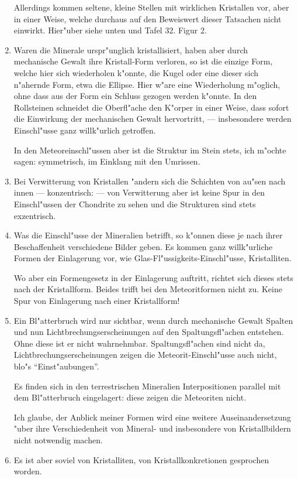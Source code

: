 \documentclass[a4paper, 11pt, oneside]{article}
\begin{document}
\begin{enumerate}
Allerdings kommen seltene, kleine Stellen mit wirklichen Kristallen vor, aber in einer Weise, welche durchaus auf den Beweiswert dieser Tatsachen nicht einwirkt. Hier"uber siehe unten und Tafel 32. Figur 2.
\item Waren die Minerale urspr"unglich kristallisiert, haben aber durch mechanische Gewalt ihre Kristall-Form verloren, so ist die einzige Form, welche hier sich wiederholen k"onnte, die Kugel oder eine dieser sich n"ahernde Form, etwa die Ellipse. Hier w"are eine Wiederholung m"oglich, ohne dass aus der Form ein Schluss gezogen werden k"onnte. In den Rollsteinen schneidet die Oberfl"ache den K"orper in einer Weise, dass sofort die Einwirkung der mechanischen Gewalt hervortritt, --- insbesondere werden Einschl"usse ganz willk"urlich getroffen.

In den Meteoreinschl"ussen aber ist die Struktur im Stein stets, ich m"ochte sagen: symmetrisch, im Einklang mit den Umrissen.
\item Bei Verwitterung von Kristallen "andern sich die Schichten von au"sen nach innen --- konzentrisch: --- von Verwitterung aber ist keine Spur in den Einschl"ussen der Chondrite zu sehen und die Strukturen sind stets exzentrisch.
\item Was die Einschl"usse der Mineralien betrifft, so k"onnen diese je nach ihrer Beschaffenheit verschiedene Bilder geben. Es kommen ganz willk"urliche Formen der Einlagerung vor, wie Glas-Fl"ussigkeits-Einschl"usse, Kristalliten.

Wo aber ein Formengesetz in der Einlagerung auftritt, richtet sich dieses stets nach der Kristallform. Beides trifft bei den Meteoritformen nicht zu. Keine Spur von Einlagerung nach einer Kristallform!
\item Ein Bl"atterbruch wird nur sichtbar, wenn durch mechanische Gewalt Spalten und nun Lichtbrechungserscheinungen auf den Spaltungsfl"achen entstehen. Ohne diese ist er nicht wahrnehmbar. Spaltungsfl"achen sind nicht da, Lichtbrechungserscheinungen zeigen die Meteorit-Einschl"usse auch nicht, blo"s "`Einst"aubungen"'.

Es finden sich in den terrestrischen Mineralien Interpositionen parallel mit dem Bl"atterbruch eingelagert: diese zeigen die Meteoriten nicht.

Ich glaube, der Anblick meiner Formen wird eine weitere Auseinandersetzung "uber ihre Verschiedenheit von Mineral- und insbesondere von Kristallbildern nicht notwendig machen.
\item Es ist aber soviel von Kristalliten, von Kristallkonkretionen gesprochen worden.


\end{enumerate}
\end{document}
